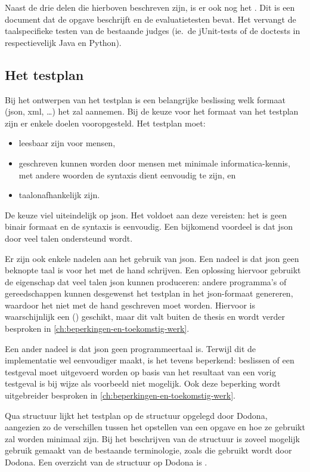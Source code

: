 Naast de drie delen die hierboven beschreven zijn, is er ook nog het .
Dit is een document dat de opgave beschrijft en de evaluatietesten bevat.
Het vervangt de taalspecifieke testen van de bestaande judges (ie.\ de jUnit-tests of de doctests in respectievelijk Java en Python).

\subsection{Het testplan}\label{subsec:het-testplan}

Bij het ontwerpen van het testplan is een belangrijke beslissing welk formaat (json, xml, \ldots) het zal aannemen.
Bij de keuze voor het formaat van het testplan zijn er enkele doelen vooropgesteld.
Het testplan moet:

\begin{itemize}
    \item leesbaar zijn voor mensen,
    \item geschreven kunnen worden door mensen met minimale informatica-kennis, met andere woorden de syntaxis dient eenvoudig te zijn, en
    \item taalonafhankelijk zijn.
\end{itemize}

De keuze viel uiteindelijk op json.
Het voldoet aan deze vereisten: het is geen binair formaat en de syntaxis is eenvoudig.
Een bijkomend voordeel is dat json door veel talen ondersteund wordt.

Er zijn ook enkele nadelen aan het gebruik van json.
Een nadeel is dat json geen beknopte taal is voor het met de hand schrijven.
Een oplossing hiervoor gebruikt de eigenschap dat veel talen json kunnen produceren: andere programma's of gereedschappen kunnen desgewenst het testplan in het json-formaat genereren, waardoor het niet met de hand geschreven moet worden.
Hiervoor is waarschijnlijk een  () geschikt, maar dit valt buiten de thesis en wordt verder besproken in \cref{ch:beperkingen-en-toekomstig-werk}.

Een ander nadeel is dat json geen programmeertaal is.
Terwijl dit de implementatie wel eenvoudiger maakt, is het tevens beperkend: beslissen of een testgeval moet uitgevoerd worden op basis van het resultaat van een vorig testgeval is bij wijze als voorbeeld niet mogelijk.
Ook deze beperking wordt uitgebreider besproken in \cref{ch:beperkingen-en-toekomstig-werk}.

Qua structuur lijkt het testplan op de structuur opgelegd door Dodona, aangezien zo de verschillen tussen het opstellen van een opgave en hoe ze gebruikt zal worden minimaal zijn.
Bij het beschrijven van de structuur is zoveel mogelijk gebruik gemaakt van de bestaande terminologie, zoals die gebruikt wordt door Dodona.
Een overzicht van de structuur op Dodona is \autocite{dodona2020}.

